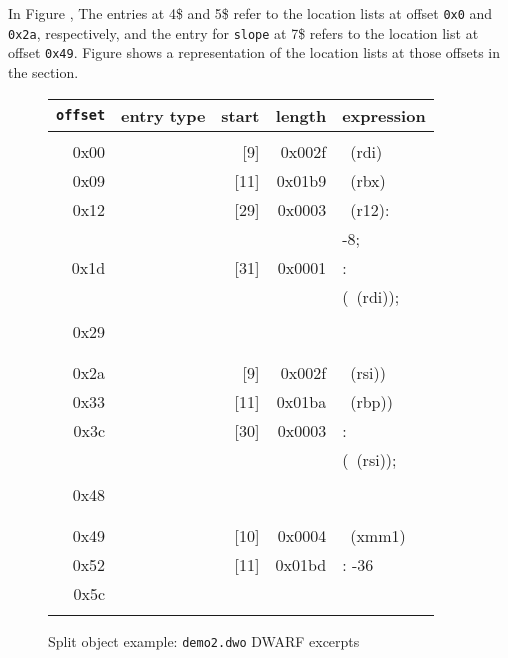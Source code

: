 In Figure ,
The \DWTAGformalparameter{} entries at 4\$ and 5\$ refer to the
location lists at offset \texttt{0x0} and \texttt{0x2a}, respectively, and the
\DWTAGvariable{} entry for \texttt{slope} at 7\$ refers to the location
list at offset \texttt{0x49}. 
Figure 
shows a representation of the
location lists at those offsets in the \dotdebuglocdwo{} section.

\begin{figure}
\begin{dwflisting}
\begin{tabular}{rlrrl}
\texttt{offset} & entry type & start & length & expression \\
\hline \\
0x00 & \DWLLEstartlengthentry &  [9] & 0x002f & \DWOPregfive~(rdi) \\
0x09 & \DWLLEstartlengthentry & [11] & 0x01b9 & \DWOPregthree~(rbx) \\
0x12 & \DWLLEstartlengthentry & [29] & 0x0003 & \DWOPbregtwelve~(r12):\\
&&&& -8; \DWOPstackvalue \\
0x1d & \DWLLEstartlengthentry & [31] & 0x0001 & \DWOPentryvalue: \\
&&&& (\DWOPregfive~(rdi)); \\
&&&& \DWOPstackvalue \\
0x29 & \DWLLEendoflistentry &&& \\
\\   & \hhline{-} &&& \\
0x2a & \DWLLEstartlengthentry &  [9] & 0x002f & \DWOPregfour~(rsi)) \\
0x33 & \DWLLEstartlengthentry & [11] & 0x01ba & \DWOPregsix~(rbp)) \\
0x3c & \DWLLEstartlengthentry & [30] & 0x0003 & \DWOPentryvalue: \\
&&&& (\DWOPregfour~(rsi)); \\
&&&& \DWOPstackvalue \\
0x48 & \DWLLEendoflistentry &&& \\
\\   & \hhline{-} &&& \\
0x49 & \DWLLEstartlengthentry & [10] & 0x0004 & \DWOPregeighteen~(xmm1) \\
0x52 & \DWLLEstartlengthentry & [11] & 0x01bd & \DWOPfbreg: -36 \\
0x5c & \DWLLEendoflistentry &&& \\
&&&& \\
\end{tabular}
\end{dwflisting}
\caption{Split object example: \texttt{demo2.dwo} DWARF \dotdebuglocdwo{} excerpts}
\label{fig:splitobjectexampledemo2dwodwarfdebuglocdwoexcerpts}
\end{figure}

